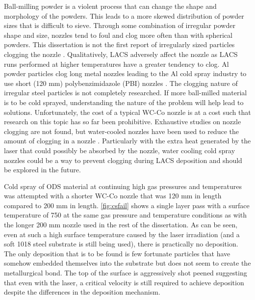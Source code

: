 			
		Ball-milling powder is a violent process that can change the shape and morphology of the powders. This leads to a more skewed distribution of powder sizes that is difficult to sieve. Through some combination of irregular powder shape and size, nozzles tend to foul and clog more often than with spherical powders. This dissertation is not the first report of irregularly sized particles clogging the nozzle \cite{RN173, RN451}. Qualitatively, LACS adversely affect the nozzle as LACS runs performed at higher temperatures have a greater tendency to clog. Al powder particles clog long metal nozzles leading to the Al cold spray industry to use short (120 mm) polybenzimidazole (PBI) nozzles \cite{RN1890}. The clogging nature of irregular steel particles is not completely researched. If more ball-milled material is to be cold sprayed, understanding the nature of the problem will help lead to solutions. Unfortunately, the cost of a typical WC-Co nozzle is at a cost such that research on this topic has so far been prohibitive. Exhaustive studies on nozzle clogging are not found, but water-cooled nozzles have been used to reduce the amount of clogging in a nozzle \cite{RN3010,RN182,RN3442,RN3443}. Particularly with the extra heat generated by the laser that could possibly be absorbed by the nozzle, water cooling cold spray nozzles could be a way to prevent clogging during LACS deposition and should be explored in the future.
			
			
		Cold spray of ODS material at continuing high gas pressures and temperatures was attempted with a shorter WC-Co nozzle that was 120 mm in length compared to 200 mm in length. \ref{fig:csfail} shows a single layer pass with a surface temperature of 750 \celsius{} at the same gas pressure and temperature conditions as with the longer 200 mm nozzle used in the rest of the dissertation. As can be seen, even at such a high surface temperature caused by the laser irradiation (and a soft 1018 steel substrate is still being used), there is practically no deposition. The only deposition that is to be found is few fortunate particles that have somehow embedded themselves into the substrate but does not seem to create the metallurgical bond. The top of the surface is aggressively shot peened suggesting that even with the laser, a critical velocity is still required to achieve deposition despite the differences in the deposition mechanism.	
		
